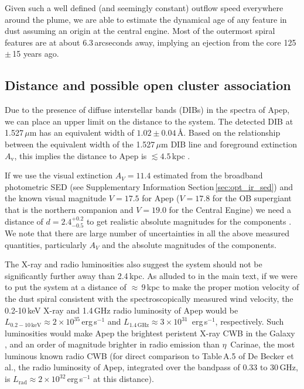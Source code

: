 \documentclass[preprint,times]{aastex61}
\begin{document}
Given such a well defined (and seemingly constant) outflow speed everywhere around the plume, we are able to estimate the dynamical age of any feature in dust assuming an origin at the central engine. Most of the outermost spiral features are at about 6.3\,arcseconds away, implying an ejection from the core 125\,$\pm$\,15 years ago.

\subsection{Distance and possible open cluster association}
\label{sec:dist}

Due to the presence of diffuse interstellar bands (DIBs) in the spectra of Apep, we can place an upper limit on the distance to the system. The detected DIB at 1.527\,$\mu$m has an equivalent width of $1.02 \pm 0.04$\,\AA. Based on the relationship between the equivalent width of the 1.527\,$\mu$m DIB line and foreground extinction $A_{\mathrm{v}}$, this implies the distance to Apep is $\lesssim 4.5$\,kpc \citep{2015ApJ...798...35Z}.

If we use the visual extinction $A_{V} = 11.4$ estimated from the broadband photometric SED (see Supplementary Information Section\,\ref{sec:opt_ir_sed}) and the known visual magnitude $V = 17.5$ for Apep ($V = 17.8$ for the OB supergiant that is the northern companion and $V = 19.0$ for the Central Engine) we need a distance of $d = 2.4^{+0.2}_{-0.5}$ to get realistic absolute magnitudes for the components \cite{2015MNRAS.447.2322R}. We note that there are large number of uncertainties in all the above measured quantities, particularly $A_{V}$ and the absolute magnitudes of the components.  

The X-ray and radio luminosities also suggest the system should not be significantly further away than 2.4\,kpc. As alluded to in the main text, if we were to put the system at a distance of $\approx$\,9\,kpc to make the proper motion velocity of the dust spiral consistent with the spectroscopically measured wind velocity, the 0.2-10\,keV X-ray and 1.4\,GHz radio luminosity of Apep would be $L_{0.2-10\,\mathrm{keV}} \approx 2 \times 10^{35}$\,erg\,s$^{-1}$ and $ L_{1.4\,\mathrm{GHz}} \approx 3 \times 10^{31}$ \,erg\,s$^{-1}$, respectively. Such luminosities would make Apep the brightest peristent X-ray CWB in the Galaxy \citep{2018MNRAS.474.3228P}, and an order of magnitude brighter in radio emission than $\eta$~Carinae, the most luminous known radio CWB (for direct comparison to Table\,A.5 of De Becker et al.\citep{2013A&A...558A..28D}, the radio luminosity of Apep, integrated over the bandpass of 0.33 to 30\,GHz, is $L_{\mathrm{rad}} \approx 2 \times 10^{32}$\,erg\,s$^{-1}$ at this distance). 
\end{document}
